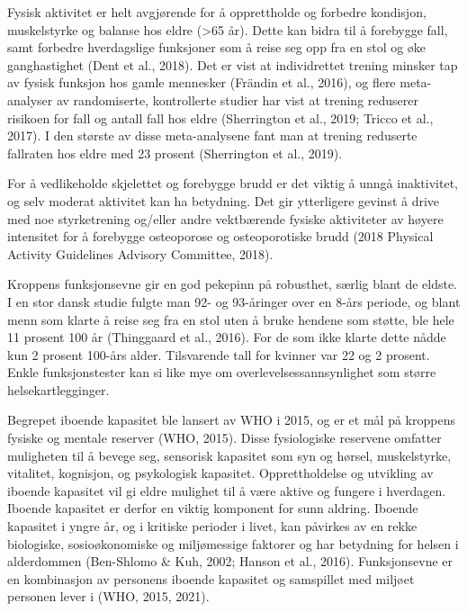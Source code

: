 \documentclass[
  letterpaper,
  DIV=11,
  numbers=noendperiod]{scrreprt}
\begin{document}
Fysisk aktivitet er helt avgjørende for å opprettholde og forbedre
kondisjon, muskelstyrke og balanse hos eldre (\textgreater65 år). Dette
kan bidra til å forebygge fall, samt forbedre hverdagslige funksjoner
som å reise seg opp fra en stol og øke ganghastighet (Dent et al.,
2018). Det er vist at individrettet trening minsker tap av fysisk
funksjon hos gamle mennesker (Frändin et al., 2016), og flere
meta-analyser av randomiserte, kontrollerte studier har vist at trening
reduserer risikoen for fall og antall fall hos eldre (Sherrington et
al., 2019; Tricco et al., 2017). I den største av disse meta-analysene
fant man at trening reduserte fallraten hos eldre med 23 prosent
(Sherrington et al., 2019). ~

For å vedlikeholde skjelettet og forebygge brudd er det viktig å unngå
inaktivitet, og selv moderat aktivitet kan ha betydning. Det gir
ytterligere gevinst å drive med noe styrketrening og/eller andre
vektbærende fysiske aktiviteter av høyere intensitet for å forebygge
osteoporose og osteoporotiske brudd (2018 Physical~ Activity Guidelines
Advisory Committee, 2018). ~

Kroppens funksjonsevne gir en god pekepinn på robusthet, særlig blant de
eldste. I en stor dansk studie fulgte man 92- og 93-åringer over en
8-års periode, og blant menn som klarte å reise seg fra en stol uten å
bruke hendene som støtte, ble hele 11 prosent 100 år (Thinggaard et al.,
2016). For de som ikke klarte dette nådde kun 2 prosent 100-års alder.
Tilsvarende tall for kvinner var 22 og 2 prosent. Enkle funksjonstester
kan si like mye om overlevelsessannsynlighet som større
helsekartlegginger.

Begrepet iboende kapasitet ble lansert av WHO i 2015, og er et mål på
kroppens fysiske og mentale reserver (WHO, 2015). Disse fysiologiske
reservene omfatter muligheten til å bevege seg, sensorisk kapasitet som
syn og hørsel, muskelstyrke, vitalitet, kognisjon, og psykologisk
kapasitet. Opprettholdelse og utvikling av iboende kapasitet vil gi
eldre mulighet til å være aktive og fungere i hverdagen. Iboende
kapasitet er derfor en viktig komponent for sunn aldring. Iboende
kapasitet i yngre år, og i kritiske perioder i livet, kan påvirkes av en
rekke biologiske, sosioøkonomiske og miljømessige faktorer og har
betydning for helsen i alderdommen (Ben-Shlomo \& Kuh, 2002; Hanson et
al., 2016). Funksjonsevne er en kombinasjon av personens iboende
kapasitet og samspillet med miljøet personen lever i (WHO, 2015, 2021).

\end{document}
